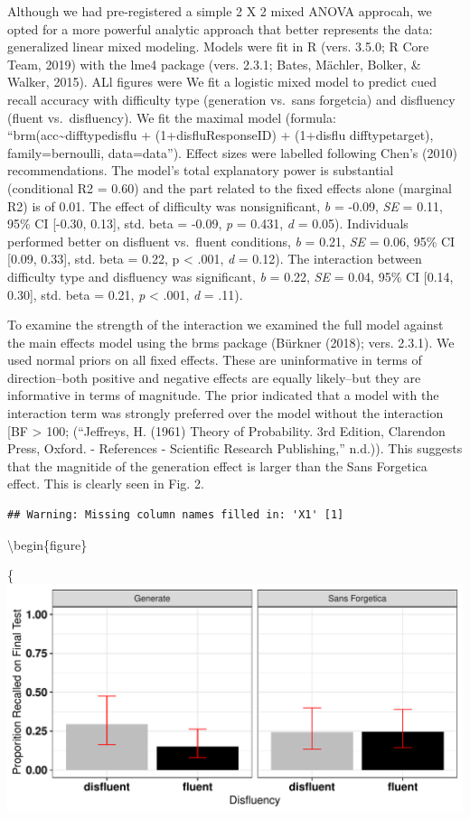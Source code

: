 \documentclass[english,doc]{apa6}
\begin{document}
Although we had pre-registered a simple 2 X 2 mixed ANOVA approcah, we opted for a more powerful analytic approach that better represents the data: generalized linear mixed modeling. Models were fit in R (vers. 3.5.0; R Core Team, 2019) with the lme4 package (vers. 2.3.1; Bates, Mächler, Bolker, \& Walker, 2015). ALl figures were We fit a logistic mixed model to predict cued recall accuracy with difficulty type (generation vs.~sans forgetcia) and disfluency (fluent vs.~disfluency). We fit the maximal model (formula: \enquote{brm(acc\textasciitilde{}difftypedisflu + (1+disflu\textbar{}ResponseID) + (1+disflu difftype\textbar{}target), family=bernoulli, data=data}). Effect sizes were labelled following Chen's (2010) recommendations. The model's total explanatory power is substantial (conditional R2 = 0.60) and the part related to the fixed effects alone (marginal R2) is of 0.01. The effect of difficulty was nonsignificant, \emph{b} = -0.09, \emph{SE} = 0.11, 95\% CI {[}-0.30, 0.13{]}, std. beta = -0.09, \emph{p} = 0.431, \emph{d} = 0.05). Individuals performed better on disfluent vs.~fluent conditions, \emph{b} = 0.21, \emph{SE} = 0.06, 95\% CI {[}0.09, 0.33{]}, std. beta = 0.22, p \textless{} .001, \emph{d} = 0.12). The interaction between difficulty type and disfluency was significant, \emph{b} = 0.22, \emph{SE} = 0.04, 95\% CI {[}0.14, 0.30{]}, std. beta = 0.21, \emph{p} \textless{} .001, \emph{d} = .11).

To examine the strength of the interaction we examined the full model against the main effects model using the brms package (Bürkner (2018); vers. 2.3.1). We used normal priors on all fixed effects. These are uninformative in terms of direction--both positive and negative effects are equally likely--but they are informative in terms of magnitude. The prior indicated that a model with the interaction term was strongly preferred over the model without the interaction {[}BF \textgreater{} 100; (``Jeffreys, H. (1961) Theory of Probability. 3rd Edition, Clarendon Press, Oxford. - References - Scientific Research Publishing,'' n.d.)). This suggests that the magnitide of the generation effect is larger than the Sans Forgetica effect. This is clearly seen in Fig. 2.

\begin{verbatim}
## Warning: Missing column names filled in: 'X1' [1]
\end{verbatim}

\textbackslash{}begin\{figure\}

\{\centering \includegraphics{SF_Paper_files/figure-latex/unnamed-chunk-2-1}
\end{document}
